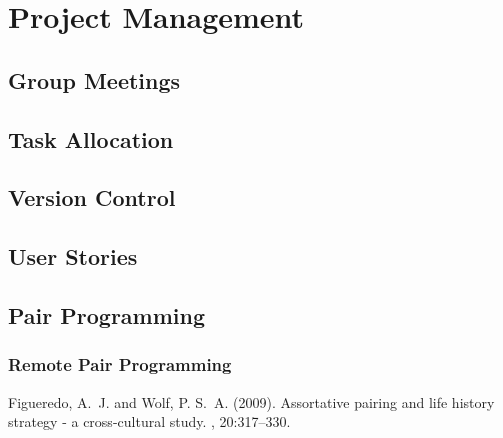\documentclass[12pt]{article} %
\begin{document}
\section{Project Management}
\subsection{Group Meetings}
\subsection{Task Allocation}
\subsection{Version Control}
\subsection{User Stories}
\subsection{Pair Programming}
\subsubsection{Remote Pair Programming}


\begin{thebibliography}{99} %

Figueredo, A.~J. and Wolf, P. S.~A. (2009).
\newblock Assortative pairing and life history strategy - a cross-cultural
  study.
, 20:317--330.
 
\end{thebibliography}

\end{document}
